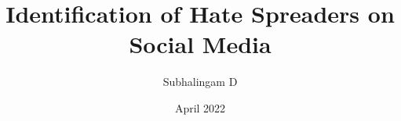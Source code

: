 \documentclass[BTech]{iitddiss}
\begin{document}

\title{Identification of Hate Spreaders on Social Media}

\author{Subhalingam D}
\date{April 2022}

\maketitle







\acknowledgements



\end{document}
